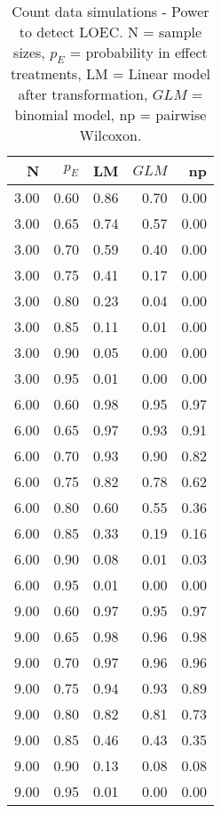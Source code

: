 \begin{table}[H]
\centering
\caption{Count data simulations - Power to detect LOEC. N = sample sizes, 
             $p_E$ = probability in effect treatments, LM = Linear model after transformation, 
             $GLM$ = binomial model, np = pairwise Wilcoxon.} 
\label{tab:pow_loec_p}
{\footnotesize
\begin{tabular}{rrrrr}
  \hline
N & $p_E$ & LM & $GLM$ & np \\ 
  \hline
3.00 & 0.60 & 0.86 & 0.70 & 0.00 \\ 
  3.00 & 0.65 & 0.74 & 0.57 & 0.00 \\ 
  3.00 & 0.70 & 0.59 & 0.40 & 0.00 \\ 
  3.00 & 0.75 & 0.41 & 0.17 & 0.00 \\ 
  3.00 & 0.80 & 0.23 & 0.04 & 0.00 \\ 
  3.00 & 0.85 & 0.11 & 0.01 & 0.00 \\ 
  3.00 & 0.90 & 0.05 & 0.00 & 0.00 \\ 
  3.00 & 0.95 & 0.01 & 0.00 & 0.00 \\ 
  6.00 & 0.60 & 0.98 & 0.95 & 0.97 \\ 
  6.00 & 0.65 & 0.97 & 0.93 & 0.91 \\ 
  6.00 & 0.70 & 0.93 & 0.90 & 0.82 \\ 
  6.00 & 0.75 & 0.82 & 0.78 & 0.62 \\ 
  6.00 & 0.80 & 0.60 & 0.55 & 0.36 \\ 
  6.00 & 0.85 & 0.33 & 0.19 & 0.16 \\ 
  6.00 & 0.90 & 0.08 & 0.01 & 0.03 \\ 
  6.00 & 0.95 & 0.01 & 0.00 & 0.00 \\ 
  9.00 & 0.60 & 0.97 & 0.95 & 0.97 \\ 
  9.00 & 0.65 & 0.98 & 0.96 & 0.98 \\ 
  9.00 & 0.70 & 0.97 & 0.96 & 0.96 \\ 
  9.00 & 0.75 & 0.94 & 0.93 & 0.89 \\ 
  9.00 & 0.80 & 0.82 & 0.81 & 0.73 \\ 
  9.00 & 0.85 & 0.46 & 0.43 & 0.35 \\ 
  9.00 & 0.90 & 0.13 & 0.08 & 0.08 \\ 
  9.00 & 0.95 & 0.01 & 0.00 & 0.00 \\ 
   \hline
\end{tabular}
}
\end{table}
